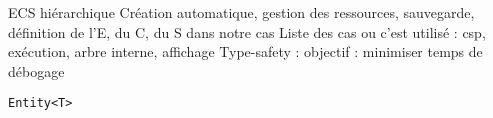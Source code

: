 \begin{block}{ECS hiérarchique}
Création automatique, gestion des ressources, sauvegarde, définition de l'E, du C, du S dans notre cas
Liste des cas ou c'est utilisé : csp, exécution, arbre interne, affichage
Type-safety : objectif : minimiser temps de débogage
\begin{lstlisting}
Entity<T>
\end{lstlisting}
\end{block}